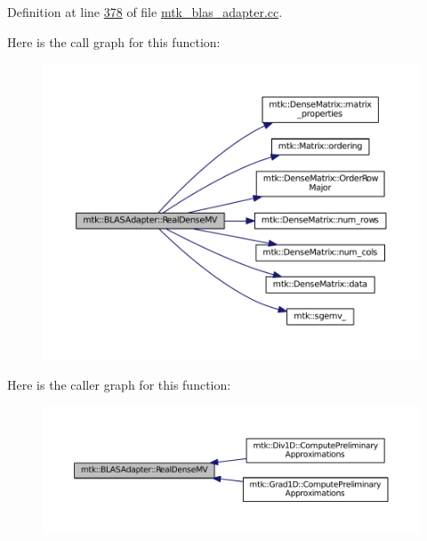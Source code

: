Definition at line \hyperlink{mtk__blas__adapter_8cc_source_l00378}{378} of file \hyperlink{mtk__blas__adapter_8cc_source}{mtk\+\_\+blas\+\_\+adapter.\+cc}.



Here is the call graph for this function\+:\nopagebreak
\begin{figure}[H]
\begin{center}
\leavevmode
\includegraphics[width=350pt]{classmtk_1_1BLASAdapter_afdcac059a4294287cb55638221220646_cgraph}
\end{center}
\end{figure}




Here is the caller graph for this function\+:\nopagebreak
\begin{figure}[H]
\begin{center}
\leavevmode
\includegraphics[width=350pt]{classmtk_1_1BLASAdapter_afdcac059a4294287cb55638221220646_icgraph}
\end{center}
\end{figure}


